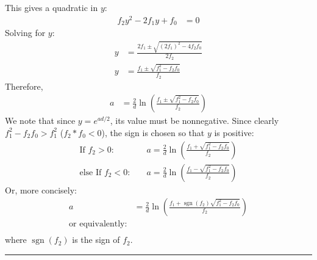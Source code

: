 This gives a quadratic in $y$:
\begin{align*}
    f_2 y^2 - 2 f_1 y + f_0 &= 0
\end{align*}
Solving for $y$:
\begin{align*}
    y &= \frac{2 f_1 \pm \sqrt{(2 f_1)^2 - 4 f_2 f_0}}{2 f_2} \\
    y &= \frac{f_1 \pm \sqrt{f_1^2 - f_2 f_0}}{f_2}
\end{align*}
Therefore,
\begin{align*}
    a &= \frac{2}{d} \ln\left( \frac{f_1 \pm \sqrt{f_1^2 - f_2 f_0}}{f_2} \right)
\end{align*}
We note that since $y=e^{a d/2}$, its value must be nonnegative. Since clearly $f_1^2 - f_2 f_0 > f_1^2$ ($f_2*f_0 < 0$), the sign is chosen so that $y$ is positive:
\begin{align*}
    \text{If } f_2 > 0: &\quad a = \frac{2}{d} \ln\left( \frac{f_1 + \sqrt{f_1^2 - f_2 f_0}}{f_2} \right) \\
    \text{else If } f_2 < 0: &\quad a = \frac{2}{d} \ln\left( \frac{f_1 - \sqrt{f_1^2 - f_2 f_0}}{f_2} \right)
\end{align*}
Or, more concisely:
\begin{align*}
    a &= \frac{2}{d} \ln\left( \frac{f_1 + \operatorname{sgn}(f_2) \sqrt{f_1^2 - f_2 f_0}}{f_2} \right) \\
    \text{or equivalently:}\\
\end{align*}
where $\operatorname{sgn}(f_2)$ is the sign of $f_2$.

\vspace{2em}
\noindent\rule{\textwidth}{0.4pt}
